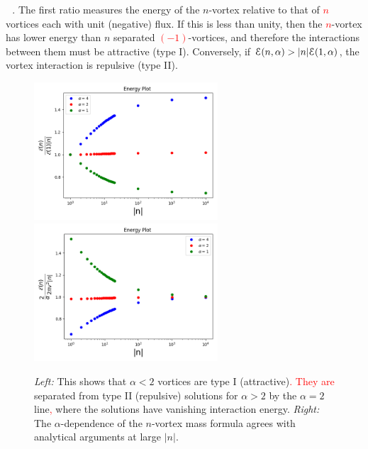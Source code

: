 \be
{}\,\qquad{} \qquad {} \quad{} \quad{}\,.\label{ratios}
\ee
The first ratio measures the energy of the $n$-vortex relative to that of \textcolor{red}{$n$} vortices each with unit (negative) flux. If this is less than unity, then the \textcolor{red}{$n$}-vortex has lower energy than $n$ separated \textcolor{red}{$\left(-1\right)$}-vortices, and therefore the interactions between them must be attractive (type I). Conversely, if ${\cal E}(n, \alpha) > |n|{\cal E}(1, \alpha)$, the vortex interaction is repulsive (type II). 
\begin{figure}[H]
\begin{center}
 \includegraphics[width=2.70in]{Chapter_2_Folder_1912.11321/figures/bpsrationeg.png}\hspace{0.1in}
    \includegraphics[width=2.70in]{Chapter_2_Folder_1912.11321/figures/mass1neg.png}
    \caption[This figure shows the energy per flux for different values of the coupling parameter $\alpha$.]{{\small{\it Left:} This shows that $\alpha < 2$ vortices are type I (attractive)\textcolor{red}{. They are} separated from type II (repulsive) solutions for $\alpha>2$ by the $\alpha=2$ line\textcolor{red}{,} where the solutions have vanishing interaction energy. {\it Right:} The $\alpha$-dependence of the $n$-vortex mass formula agrees with analytical arguments at large $|n|$. }} \label{fig:massn1}
   \end{center}
\end{figure}
